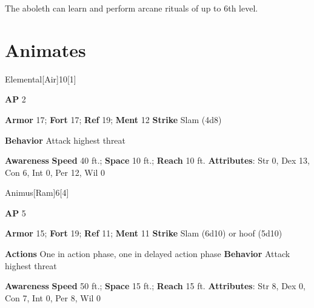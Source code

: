 The aboleth can learn and perform arcane rituals of up to 6th level.

\section{Animates}
\begin{monsection}{Elemental}[Air]{10}[1]
\vspace{-1em}\vspace{-1em}
\begin{spellcontent}
\begin{spelltargetinginfo}
{\textbf{AP} 2}

\pari \textbf{Armor} 17;
\textbf{Fort} 17;
\textbf{Ref} 19;
\textbf{Ment} 12
\pari \textbf{Strike} Slam  (4d8)



\pari \textbf{Behavior} Attack highest threat
\end{spelltargetinginfo}
\end{spellcontent}

\begin{monsterfooter}
\pari \textbf{Awareness} 
\pari \textbf{Speed} 40 ft.;
\textbf{Space} 10 ft.;
\textbf{Reach} 10 ft.
\pari \textbf{Attributes}:
Str 0,
Dex 13,
Con 6,
Int 0,
Per 12,
Wil 0
\end{monsterfooter}
\end{monsection}

\begin{monsection}{Animus}[Ram]{6}[4]
\vspace{-1em}\vspace{-1em}
\begin{spellcontent}
\begin{spelltargetinginfo}
{\textbf{AP} 5}

\pari \textbf{Armor} 15;
\textbf{Fort} 19;
\textbf{Ref} 11;
\textbf{Ment} 11
\pari \textbf{Strike} Slam  (6d10) or hoof  (5d10)


\pari \textbf{Actions} One in action phase, one in delayed action phase
\pari \textbf{Behavior} Attack highest threat
\end{spelltargetinginfo}
\end{spellcontent}

\begin{monsterfooter}
\pari \textbf{Awareness} 
\pari \textbf{Speed} 50 ft.;
\textbf{Space} 15 ft.;
\textbf{Reach} 15 ft.
\pari \textbf{Attributes}:
Str 8,
Dex 0,
Con 7,
Int 0,
Per 8,
Wil 0
\end{monsterfooter}
\end{monsection}



